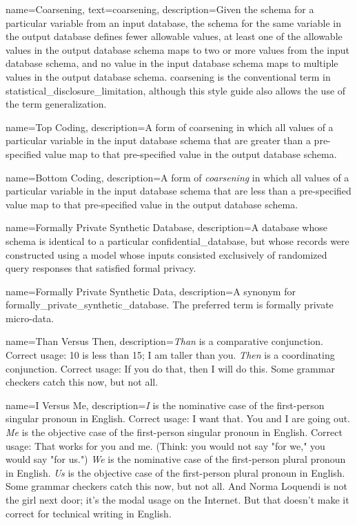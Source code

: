 {
    name=Coarsening,
    text=coarsening,
    description={Given the schema for a particular variable from an input database, the schema for the same variable in the output database defines fewer allowable values, at least one of the allowable values in the output database schema maps to two or more values from the input database schema, and no value in the input database schema maps to multiple values in the output database schema. \Gls{coarsening} is the conventional term in \gls{statistical_disclosure_limitation}, although this style guide also allows the use of the term \gls{generalization}.}
}

{
    name=Top Coding,
    description={A form of \gls{coarsening} in which all values of a particular variable in the input database schema that are greater than a pre-specified value map to that pre-specified value in the output database schema.}
}

{
    name=Bottom Coding,
    description={A form of \emph{coarsening} in which all values of a particular variable in the input database schema that are less than a pre-specified value map to that pre-specified value in the output database schema.}
}

{
    name=Formally Private Synthetic Database,
    description={A \gls{database} whose schema is identical to a particular \gls{confidential_database}, but whose \glspl{record} were constructed using a model whose inputs consisted exclusively of randomized query responses that satisfied formal privacy.}
}

{
    name=Formally Private Synthetic Data,
    description={A synonym for \gls{formally_private_synthetic_database}. The preferred term is formally private micro-data.}
}

{
    name=Than Versus Then,
    description={\textit{Than} is a comparative conjunction. Correct usage: 10 is less than 15; I am taller than you. \textit{Then} is a coordinating conjunction. Correct usage: If you do that, then I will do this. Some grammar checkers catch this now, but not all.}
}

{
    name=I Versus Me,
    description={\textit{I} is the nominative case of the first-person singular pronoun in English. Correct usage: I want that. You and I are going out. \textit{Me} is the objective case of the first-person singular pronoun in English. Correct usage: That works for you and me. (Think: you would not say "for we," you would say "for us.") \textit{We} is the nominative case of the first-person plural pronoun in English. \textit{Us} is the objective case of the first-person plural pronoun in English. Some grammar checkers catch this now, but not all. And Norma Loquendi is not the girl next door; it's the modal usage on the Internet. But that doesn't make it correct for technical writing in English.}
}


